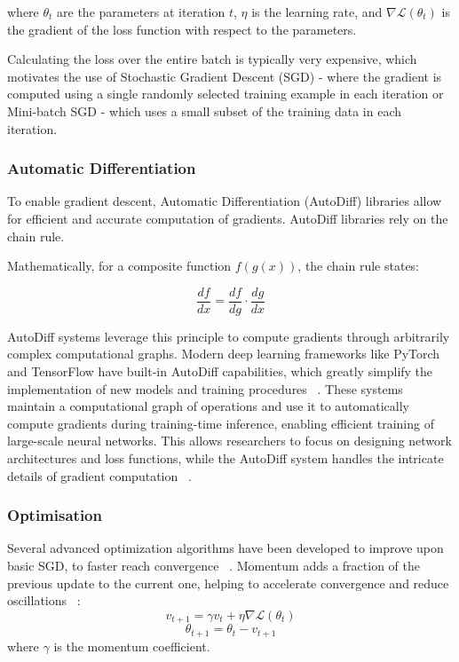 \documentclass[a4paper, oneside]{discothesis}
\begin{document}
where $\theta_t$ are the parameters at iteration $t$, $\eta$ is the learning rate, and $\nabla \mathcal{L}(\theta_t)$ is the gradient of the loss function with respect to the parameters.

Calculating the loss over the entire batch is typically very expensive, which motivates the use of Stochastic Gradient Descent (SGD) -  where the gradient is computed using a single randomly selected training example in each iteration or Mini-batch SGD - which uses a small subset of the training data in each iteration.

\subsubsection{Automatic Differentiation}

To enable gradient descent, Automatic Differentiation (AutoDiff) libraries allow for efficient and accurate computation of gradients. AutoDiff libraries rely on the chain rule. 

Mathematically, for a composite function $f(g(x))$, the chain rule states:

\begin{equation}
    \frac{df}{dx} = \frac{df}{dg} \cdot \frac{dg}{dx}
\end{equation}

AutoDiff systems leverage this principle to compute gradients through arbitrarily complex computational graphs. Modern deep learning frameworks like PyTorch and TensorFlow have built-in AutoDiff capabilities, which greatly simplify the implementation of new models and training procedures ~\cite{paszke2019pytorch, abadi2016tensorflow}. These systems maintain a computational graph of operations and use it to automatically compute gradients during training-time inference, enabling efficient training of large-scale neural networks. This allows researchers to focus on designing network architectures and loss functions, while the AutoDiff system handles the intricate details of gradient computation ~\cite{baydin2018automatic}.

\subsubsection{Optimisation}

Several advanced optimization algorithms have been developed to improve upon basic SGD, to faster reach convergence ~\cite{ruder2017overviewgradientdescentoptimization}.
Momentum adds a fraction of the previous update to the current one, helping to accelerate convergence and reduce oscillations ~\cite{sutskever2013importance}:
\begin{equation}
    v_{t+1} = \gamma v_t + \eta \nabla \mathcal{L}(\theta_t)
\end{equation}
\begin{equation}
    \theta_{t+1} = \theta_t - v_{t+1}
\end{equation}
where $\gamma$ is the momentum coefficient.
\end{document}
